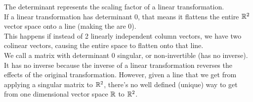 \documentclass[12pt]{article}
\begin{document}
    The determinant represents the scaling
    factor of a linear transformation. \\
    If a linear transformation has determinant 0,
    that means it flattens the entire $\mathbb{R}^2$
    vector space onto a line (making the are 0). \\
    This happens if instead of 2 linearly
    independent column vectors, we have two colinear
    vectors, causing the entire space
    to flatten onto that line. \\
    We call a matrix with determinant 0 singular,
    or non-invertible (has no inverse). \\
    It has no inverse because the inverse
    of a linear transformation reverses the effects
    of the original transformation.
    However, given a line that we get from
    applying a singular matrix to $\mathbb{R}^2$,
    there's no well defined (unique) way to get 
    from one dimensional vector space $\mathbb{R}$ to $\mathbb{R}^2$. \\

 
\end{document}
